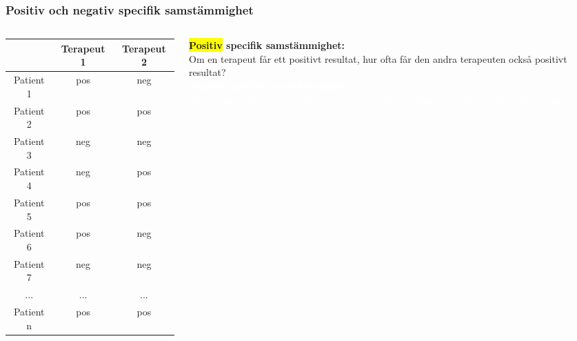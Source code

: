 \documentclass[aspectratio=169,12pt,handout,usenames,dvipsnames]{beamer}
\begin{document}
\begin{frame}
	\frametitle{Positiv och negativ specifik samstämmighet}
	\begin{columns}
		\begin{column}{0.5\textwidth}
			{
				\setlength\extrarowheight{2pt}
				\noindent\begin{tabular}{c|cc}
					& Terapeut 1  & Terapeut 2 \\
					\hline
					Patient 1 &pos&neg\\
					Patient 2 &\cellcolor{yellow}pos&\cellcolor{yellow}pos \\
					Patient 3 &neg&neg\\
					Patient 4 &neg&pos\\
					Patient 5 &\cellcolor{yellow}pos&\cellcolor{yellow}pos \\
					Patient 6 &pos&neg\\
					Patient 7 &neg&neg\\
					... &...&...\\		
					Patient n &\cellcolor{yellow}pos&\cellcolor{yellow}pos \\
				\end{tabular}
			}
		\end{column}
		\begin{column}{0.5\textwidth}
			
			{\bfseries \colorbox{yellow}{Positiv} specifik samstämmighet:}\\
			Om en terapeut får ett positivt resultat, hur ofta får den andra terapeuten också positivt resultat?\\[2ex]
			
			\textcolor{white}{{\bfseries Negativ specifik samstämmighet:}\\
			Om en terapeut får ett negativt resultat, hur ofta får den andra terapeuten också negativt resultat?}
		\end{column}
	\end{columns}
\end{frame}
\end{document}
